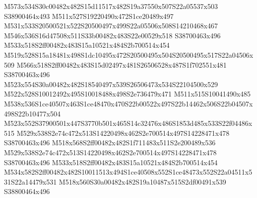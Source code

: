 \documentclass{article}
\begin{document}
\begin{multicols}{2}
M573x534S30c00482x482S15d11517x482S19a37550x507S22a05537x503 S38900464x493 M511x527S19220490x472S1ce20489x497 M531x533S20500521x522S20500497x499S22a05506x508S14210468x467 M546x536S16d47508x511S33b00482x483S22e00529x518 S38700463x496 M533x518S2ff00482x483S15a10521x484S2b700514x454 M519x528S15a18481x498S1dc10495x472S20500495x504S20500495x517S22a04506x509 M566x518S2ff00482x483S15d02497x481S26506528x487S1f702551x481 S38700463x496 M523x554S30a00482x482S18540497x539S26506473x534S22104500x529 M522x528S10012492x495S10018488x498S2e736479x471 M511x515S10041490x485 M538x536S1ce40507x463S1ce48470x470S22b00522x497S22b14462x506S22b04507x498S22b10477x504 M523x552S37900501x447S3770b501x465S14c32476x486S1853d485x533S22f04486x515 M529x538S2e74c472x513S14220498x462S2e700514x497S14228471x478 S38700463x496 M518x568S2ff00482x482S1f711483x511S2e200489x536 M529x538S2e74c472x513S14220498x462S2e700514x497S14228471x478 S38700463x496 M533x518S2ff00482x483S15a10521x484S2b700514x454 M534x582S2ff00482x482S10011513x494S1ce40508x552S1ce48473x552S22a04511x531S22a14479x531 M518x560S30a00482x482S19a10487x515S2df00491x539 S38800464x496











\end{multicols}
\end{document}
